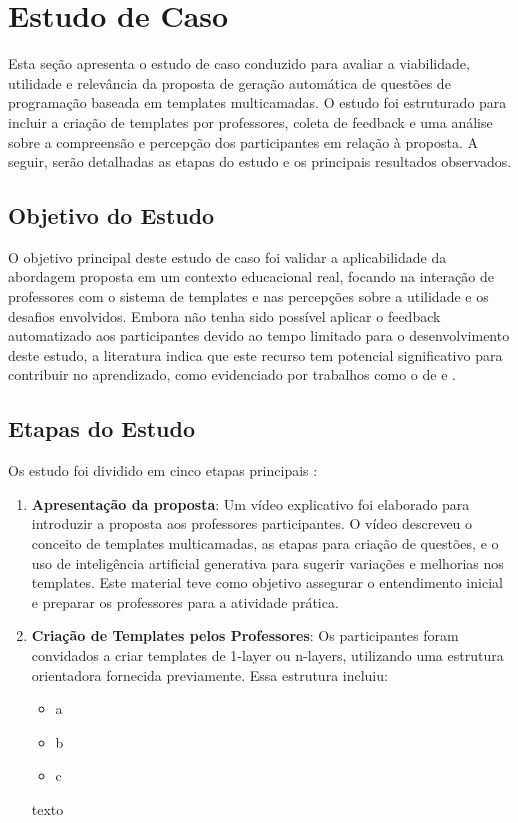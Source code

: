 \chapter{Estudo de Caso}

Esta seção apresenta o estudo de caso conduzido para avaliar a viabilidade, utilidade e relevância da proposta de geração automática de questões de programação baseada em templates multicamadas. O estudo foi estruturado para incluir a criação de templates por professores, coleta de feedback e uma análise sobre a compreensão e percepção dos participantes em relação à proposta. A seguir,  serão detalhadas as etapas do estudo e os principais resultados observados. 

\section{Objetivo do Estudo}
O objetivo principal deste estudo de caso foi validar a aplicabilidade da abordagem proposta em um contexto educacional real, focando na interação de professores com o sistema de templates e nas percepções sobre a utilidade e os desafios envolvidos. Embora não tenha sido possível aplicar o feedback automatizado aos participantes devido ao tempo limitado para o desenvolvimento deste estudo, a literatura  indica que este recurso tem potencial significativo para contribuir no aprendizado, como evidenciado por trabalhos como o de \parencite{vanpraet2024} e \parencite{fung2024}.


\section{Etapas do Estudo}

Os estudo foi dividido em cinco etapas principais : 

\begin{enumerate}
    \item \textbf{Apresentação da proposta}: Um vídeo explicativo foi elaborado para introduzir a proposta aos professores participantes. O vídeo descreveu o conceito de templates multicamadas, as etapas para criação de questões, e o uso de inteligência artificial generativa para sugerir variações e melhorias nos templates. Este material teve como objetivo assegurar o entendimento inicial e preparar os professores para a atividade prática.
    
    \item \textbf{Criação de Templates pelos Professores}: Os participantes foram convidados a criar templates de 1-layer ou n-layers, utilizando uma estrutura orientadora fornecida previamente. Essa estrutura incluiu:
    \begin{itemize}
        \item a
        \item b
        \item c
    \end{itemize}
    texto
\end{enumerate}

